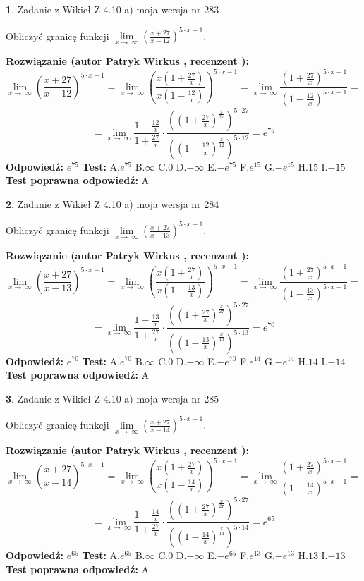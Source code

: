 \documentclass[12pt, a4paper]{article}
\theoremstyle{definition} %
\newtheorem{zad}{}
\newcommand{\zadStart}[1]{\begin{zad}#1\newline}
\newcommand{\zadStop}{\end{zad}}
\newcommand{\rozwStart}[2]{\noindent \textbf{Rozwiązanie (autor #1 , recenzent #2): }\newline}
\newcommand{\rozwStop}{\newline}
\newcommand{\odpStart}{\noindent \textbf{Odpowiedź:}\newline}
\newcommand{\odpStop}{\newline}
\newcommand{\testStart}{\noindent \textbf{Test:}\newline}
\newcommand{\testStop}{\newline}
\newcommand{\kluczStart}{\noindent \textbf{Test poprawna odpowiedź:}\newline}
\newcommand{\kluczStop}{\newline}
\begin{document}
\zadStart{Zadanie z Wikieł Z 4.10 a) moja wersja nr 283}

Obliczyć granicę funkcji  $\lim\limits_{x\to\ \infty}(\frac{x+27}{x-12})^{5\cdot x-1}$.
\zadStop
\rozwStart{Patryk Wirkus}{}
$$\lim\limits_{x\to\ \infty}(\frac{x+27}{x-12})^{5\cdot x-1} = \lim\limits_{x\to\ \infty}(\frac{x(1+\frac{27}{x})}{x(1-\frac{12}{x})})^{5\cdot x-1}=\lim\limits_{x\to\ \infty}\frac{(1+\frac{27}{x})^{5\cdot x-1}}{(1-\frac{12}{x})^{5\cdot x-1}}=$$
$$=\lim\limits_{x\to\ \infty}\frac{1-\frac{12}{x}}{1+\frac{27}{x}}\cdot\frac{((1+\frac{27}{x})^{\frac{x}{27}})^{5\cdot27}}{((1-\frac{12}{x})^{\frac{x}{12}})^{5\cdot12}}=e^{75}$$
\rozwStop
\odpStart
$e^{75}$
\odpStop
\testStart
A.$e^{75}$ B.$\infty$ C.$0$ D.$-\infty$ E.$-e^{75}$
F.$e^{15}$ G.$-e^{15}$
H.$15$
I.$-15$
\testStop
\kluczStart
A
\kluczStop



\zadStart{Zadanie z Wikieł Z 4.10 a) moja wersja nr 284}

Obliczyć granicę funkcji  $\lim\limits_{x\to\ \infty}(\frac{x+27}{x-13})^{5\cdot x-1}$.
\zadStop
\rozwStart{Patryk Wirkus}{}
$$\lim\limits_{x\to\ \infty}(\frac{x+27}{x-13})^{5\cdot x-1} = \lim\limits_{x\to\ \infty}(\frac{x(1+\frac{27}{x})}{x(1-\frac{13}{x})})^{5\cdot x-1}=\lim\limits_{x\to\ \infty}\frac{(1+\frac{27}{x})^{5\cdot x-1}}{(1-\frac{13}{x})^{5\cdot x-1}}=$$
$$=\lim\limits_{x\to\ \infty}\frac{1-\frac{13}{x}}{1+\frac{27}{x}}\cdot\frac{((1+\frac{27}{x})^{\frac{x}{27}})^{5\cdot27}}{((1-\frac{13}{x})^{\frac{x}{13}})^{5\cdot13}}=e^{70}$$
\rozwStop
\odpStart
$e^{70}$
\odpStop
\testStart
A.$e^{70}$ B.$\infty$ C.$0$ D.$-\infty$ E.$-e^{70}$
F.$e^{14}$ G.$-e^{14}$
H.$14$
I.$-14$
\testStop
\kluczStart
A
\kluczStop



\zadStart{Zadanie z Wikieł Z 4.10 a) moja wersja nr 285}

Obliczyć granicę funkcji  $\lim\limits_{x\to\ \infty}(\frac{x+27}{x-14})^{5\cdot x-1}$.
\zadStop
\rozwStart{Patryk Wirkus}{}
$$\lim\limits_{x\to\ \infty}(\frac{x+27}{x-14})^{5\cdot x-1} = \lim\limits_{x\to\ \infty}(\frac{x(1+\frac{27}{x})}{x(1-\frac{14}{x})})^{5\cdot x-1}=\lim\limits_{x\to\ \infty}\frac{(1+\frac{27}{x})^{5\cdot x-1}}{(1-\frac{14}{x})^{5\cdot x-1}}=$$
$$=\lim\limits_{x\to\ \infty}\frac{1-\frac{14}{x}}{1+\frac{27}{x}}\cdot\frac{((1+\frac{27}{x})^{\frac{x}{27}})^{5\cdot27}}{((1-\frac{14}{x})^{\frac{x}{14}})^{5\cdot14}}=e^{65}$$
\rozwStop
\odpStart
$e^{65}$
\odpStop
\testStart
A.$e^{65}$ B.$\infty$ C.$0$ D.$-\infty$ E.$-e^{65}$
F.$e^{13}$ G.$-e^{13}$
H.$13$
I.$-13$
\testStop
\kluczStart
A
\kluczStop
\end{document}
